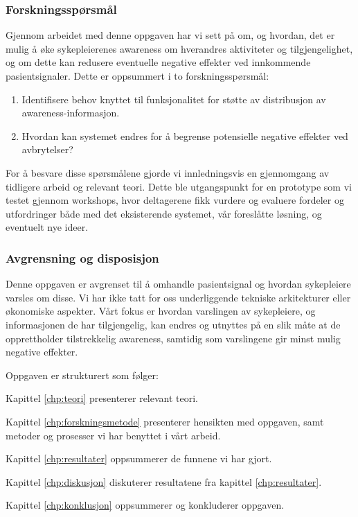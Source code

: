 \subsubsection{Forskningsspørsmål}
Gjennom arbeidet med denne oppgaven har vi sett på om, og hvordan, det er mulig å øke sykepleierenes awareness om hverandres aktiviteter og tilgjengelighet, og om dette kan redusere eventuelle negative effekter ved innkommende pasientsignaler. Dette er oppsummert i to forskningsspørsmål:

\begin{enumerate}
  \item Identifisere behov knyttet til funksjonalitet for støtte av distribusjon av awareness-informasjon.
  \item Hvordan kan systemet endres for å begrense potensielle negative effekter ved avbrytelser?
\end{enumerate}

\noindent
For å besvare disse spørsmålene gjorde vi innledningsvis en gjennomgang av tidligere arbeid og relevant teori. Dette ble utgangspunkt for en prototype som vi testet gjennom workshops, hvor deltagerene fikk vurdere og evaluere fordeler og utfordringer både med det eksisterende systemet, vår foreslåtte løsning, og eventuelt nye ideer. 

\subsubsection{Avgrensning og disposisjon}
Denne oppgaven er avgrenset til å omhandle pasientsignal og hvordan sykepleiere varsles om disse. Vi har ikke tatt for oss underliggende tekniske arkitekturer eller økonomiske aspekter. Vårt fokus er hvordan varslingen av sykepleiere, og informasjonen de har tilgjengelig, kan endres og utnyttes på en slik måte at de opprettholder tilstrekkelig awareness, samtidig som varslingene gir minst mulig negative effekter.

\noindent
Oppgaven er strukturert som følger:

\noindent
Kapittel \ref{chp:teori} presenterer relevant teori.

\noindent
Kapittel \ref{chp:forskningsmetode} presenterer hensikten med oppgaven, samt metoder og prosesser vi har benyttet i vårt arbeid. 

\noindent
Kapittel \ref{chp:resultater} oppsummerer de funnene vi har gjort.

\noindent
Kapittel \ref{chp:diskusjon} diskuterer resultatene fra kapittel \ref{chp:resultater}.

\noindent
Kapittel \ref{chp:konklusjon} oppsummerer og konkluderer oppgaven.


